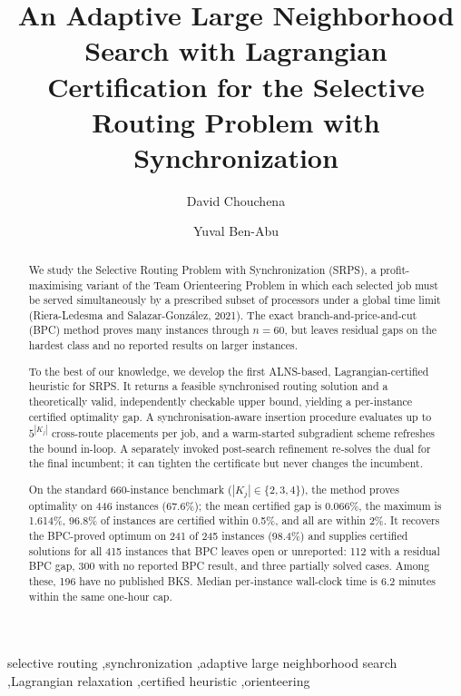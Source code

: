 \documentclass[preprint,12pt]{elsarticle}
\begin{document}
\begin{frontmatter}

\title{An Adaptive Large Neighborhood Search with Lagrangian Certification for the Selective Routing Problem with Synchronization}

\author[aff1]{David Chouchena}

\author[aff1]{Yuval Ben-Abu}

\address[aff1]{Sapir Academic Institute, D.N. Hof Ashkelon 7915600, Israel}

\begin{abstract}
We study the Selective Routing Problem with Synchronization (SRPS), a
profit-maximising variant of the Team Orienteering Problem in which each
selected job must be served simultaneously by a prescribed subset of processors
under a global time limit (Riera-Ledesma and Salazar-Gonz\'alez, 2021). The exact
branch-and-price-and-cut (BPC) method proves many instances through $n=60$, but
leaves residual gaps on the hardest class and no reported results on larger
instances.

To the best of our knowledge, we develop the first ALNS-based,
Lagrangian-certified heuristic for SRPS. It returns a feasible synchronised
routing solution and a theoretically valid, independently checkable upper
bound, yielding a per-instance certified optimality gap. A
synchronisation-aware insertion procedure evaluates up to $5^{|K_j|}$
cross-route placements per job, and a warm-started subgradient scheme refreshes
the bound in-loop. A separately invoked post-search refinement re-solves the
dual for the final incumbent; it can tighten the certificate but never changes
the incumbent.

On the standard 660-instance benchmark ($|K_j|\in\{2,3,4\}$), the method
proves optimality on 446 instances (67.6\%); the mean certified gap is
0.066\%, the maximum is 1.614\%, 96.8\% of instances are certified within
0.5\%, and all are within 2\%. It recovers the BPC-proved optimum on 241 of
245 instances (98.4\%) and supplies certified solutions for all 415 instances
that BPC leaves open or unreported: 112 with a residual BPC gap, 300 with no
reported BPC result, and three partially solved cases. Among these, 196 have no
published BKS. Median per-instance wall-clock time is 6.2 minutes
within the same one-hour cap.
\end{abstract}

\begin{keyword}
selective routing \sep synchronization \sep adaptive large neighborhood search \sep Lagrangian relaxation \sep certified heuristic \sep orienteering
\end{keyword}

\end{frontmatter}
\end{document}
